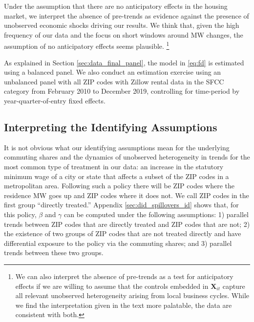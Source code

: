 Under the assumption that there are no anticipatory effects in the housing 
market, we interpret the absence of pre-trends as evidence against the presence 
of unobserved economic shocks driving our results.
We think that, given the high frequency of our data and the focus on short 
windows around MW changes, the assumption of no anticipatory effects seems 
plausible.%
\footnote{We can also interpret the absence of pre-trends as a test for 
anticipatory effects if we are willing to assume that the controls embedded in 
$\mathbf{X}_{it}$ capture all relevant unobserved heterogeneity arising from 
local business cycles.
While we find the interpretation given in the text more palatable, the data are 
consistent with both.}


As explained in Section \ref{sec:data_final_panel}, 
the model in \eqref{eq:fd} is estimated using a balanced panel.
We also conduct an estimation exercise using an unbalanced panel with all 
ZIP codes with Zillow rental data in the SFCC category 
from February 2010 to December 2019, controlling for time-period by 
year-quarter-of-entry fixed effects.


\subsection{Interpreting the Identifying Assumptions}

It is not obvious what our identifying assumptions mean for the underlying 
commuting shares and the dynamics of unobserved heterogeneity in trends for the 
most common type of treatment in our data:
an increase in the statutory minimum wage of a city or state that affects 
a subset of the ZIP codes in a metropolitan area.
Following such a policy there will be ZIP codes where the residence MW goes up
and ZIP codes where it does not.
We call ZIP codes in the first group ``directly treated.''
Appendix \ref{sec:did_spillovers_id} shows that, for this policy, 
$\beta$ and $\gamma$ can be computed under the following assumptions: 
1) parallel trends between ZIP codes that are directly treated and ZIP codes 
that are not;
2) the existence of two groups of ZIP codes that are not treated directly and
have differential exposure to the policy via the commuting shares; and 
3) parallel trends between these two groups.


